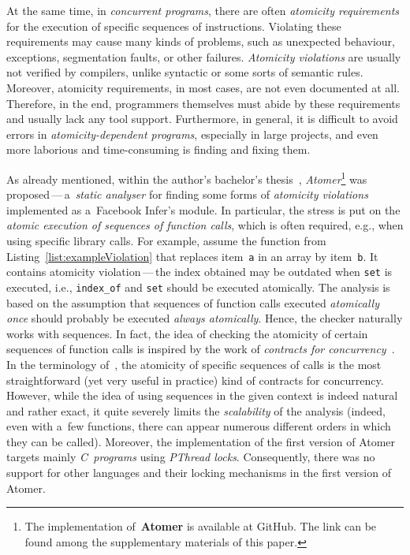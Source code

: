 \documentclass{ExcelAtFIT}
\theoremstyle{example}
\begin{document}
At the same time, in \emph{concurrent programs}, there are often \emph{atomicity requirements} for the execution of specific sequences of instructions. Violating these requirements may cause many kinds of problems, such as unexpected behaviour, exceptions, segmentation faults, or other failures. \emph{Atomicity violations} are usually not verified by compilers, unlike syntactic or some sorts of semantic rules. Moreover, atomicity requirements, in most cases, are not even documented at all. Therefore, in the end, programmers themselves must abide by these requirements and usually lack any tool support. Furthermore, in general, it is difficult to avoid errors in \emph{atomicity-dependent programs}, especially in large projects, and even more laborious and time-consuming is finding and fixing them.

As already mentioned, within the author's bachelor's thesis~\cite{harmimBP}, \emph{Atomer}\footnote{The implementation of~\textbf{Atomer} is available at GitHub. The link can be found among the supplementary materials of this paper.} was proposed\,---\,a~\emph{static analyser} for finding some forms of \emph{atomicity violations} implemented as a~Facebook Infer's module. In particular, the stress is put on the \emph{atomic execution of sequences of function calls}, which is often required, e.g., when using specific library calls. For example, assume the function from Listing~\ref{list:exampleViolation} that replaces item~\texttt{a} in an array by item~\texttt{b}. It contains atomicity violation\,---\,the index obtained may be outdated when \texttt{set} is executed, i.e., \texttt{index\_of} and \texttt{set} should be executed atomically. The analysis is based on the assumption that sequences of function calls executed \emph{atomically once} should probably be executed \emph{always atomically}. Hence, the checker naturally works with sequences. In fact, the idea of checking the atomicity of certain sequences of function calls is inspired by the work of \emph{contracts for concurrency}~\cite{contracts2017}. In the terminology of~\cite{contracts2017}, the atomicity of specific sequences of calls is the most straightforward (yet very useful in practice) kind of contracts for concurrency. However, while the idea of using sequences in the given context is indeed natural and rather exact, it quite severely limits the \emph{scalability} of the analysis (indeed, even with a~few functions, there can appear numerous different orders in which they can be called). Moreover, the implementation of the first version of Atomer targets mainly \emph{C~programs} using \emph{PThread locks}. Consequently, there was no support for other languages and their locking mechanisms in the first version of Atomer.
\end{document}
